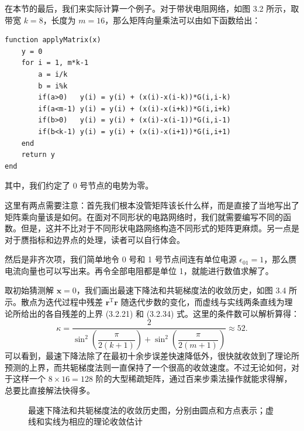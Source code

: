 在本节的最后，我们来实际计算一个例子。对于带状电阻网络，如图 3.2 所示，取带宽 $k=8$，长度为 $m=16$，那么矩阵向量乘法可以由如下函数给出：
\begin{algorithmBox}[带状网络矩阵向量乘法]
\begin{lstlisting}[style=bellacode]
function applyMatrix(x)
    y = 0
    for i = 1, m*k-1
        a = i/k
        b = i%k
        if(a>0)   y(i) = y(i) + (x(i)-x(i-k))*G(i,i-k)
        if(a<m-1) y(i) = y(i) + (x(i)-x(i+k))*G(i,i+k)
        if(b>0)   y(i) = y(i) + (x(i)-x(i-1))*G(i,i-1)
        if(b<k-1) y(i) = y(i) + (x(i)-x(i+1))*G(i,i+1)
    end
    return y
end
\end{lstlisting}
\end{algorithmBox}
其中，我们约定了 0 号节点的电势为零。

这里有两点需要注意：首先我们根本没管矩阵该长什么样，而是直接了当地写出了矩阵乘向量该是如何。在面对不同形状的电路网络时，我们就需要编写不同的函数。但是，这并不比对于不同形状电路网络构造不同形式的矩阵更麻烦。另一点是对于赝指标和边界点的处理，读者可以自行体会。

然后是非齐次项，我们简单地令 0 号和 1 号节点间连有单位电源 $\epsilon_{01}=1$，那么赝电流向量也可以写出来。再令全部电阻都是单位 1，就能进行数值求解了。

取初始猜测解 $\bm x=0$，我们画出最速下降法和共轭梯度法的收敛历史，如图 3.4 所示。散点为迭代过程中残差 $\bm r^{\mathrm T}\bm r$ 随迭代步数的变化，而虚线与实线两条直线为理论所给出的各自残差的上界 (3.2.21) 和 (3.2.34) 式。这里的条件数可以解析算得：
\[
\kappa=\frac{2}{\sin^2\!\left(\dfrac{\pi}{2(k+1)}\right)+
\sin^2\!\left(\dfrac{\pi}{2(m+1)}\right)}\approx52.
\]
可以看到，最速下降法除了在最初十余步误差快速降低外，很快就收敛到了理论所预测的上界，而共轭梯度法则一直保持了一个很高的收敛速度。不过无论如何，对于这样一个 $8\times16=128$ 阶的大型稀疏矩阵，通过百来步乘法操作就能求得解，总要比直接解法快得多。

\begin{figure}[htbp]
\centering
{}
\caption{最速下降法和共轭梯度法的收敛历史图，分别由圆点和方点表示；虚线和实线为相应的理论收敛估计}
\label{fig:sd-cg-convergence}
\end{figure}



